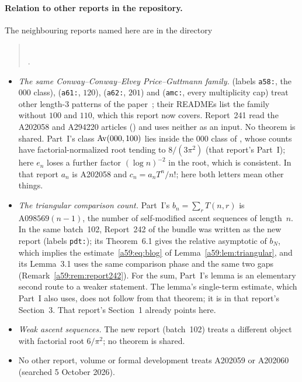 \documentclass[11pt,letterpaper]{article}
\theoremstyle{remark}\newtheorem{remark}[theorem]{Remark}
\theoremstyle{remark}\newtheorem{wremark}{Remark}\renewcommand{\thewremark}{W\arabic{wremark}}
\theoremstyle{plain}\newtheorem{wcorollary}[wremark]{Corollary}
\begin{document}
\paragraph{Relation to other reports in the repository.}
The neighbouring reports named here are in the directory
\begin{quote}\small
{}\\
.
\end{quote}
\begin{itemize}
\item \emph{The same Conway--Conway--Elvey Price--Guttmann family.}
 (labels \texttt{a58:}, the $000$ class),
 (\texttt{a61:}, $120$),
 (\texttt{a62:}, $201$) and
 (\texttt{amc:}, every multiplicity
cap) treat other length-3 patterns of the paper~\cite{conway}; their READMEs
list the family without $100$ and $110$, which this report now covers.
Report~241 read the A202058 and A294220 articles (\cite{MultiplicityReports}) and
uses neither as an input. No theorem is shared. Part~I's class
$\operatorname{Av}(000,100)$ lies inside the $000$ class of
, whose counts have factorial-normalized
root tending to $8/(3\pi^2)$ (that report's Part~I); here $e_n$ loses a
further factor $(\log n)^{-2}$ in the root, which is consistent. In that
report $a_n$ is A202058 and $c_n=a_nT^n/n!$; here both letters mean other
things.
\item \emph{The triangular comparison count.} Part~I's $b_n=\sum_rT(n,r)$
is $\mathrm{A098569}(n-1)$, the number of self-modified ascent sequences of
length~$n$. In the same batch~102, Report~242 of the bundle was written
as the new report  (labels
\texttt{pdt:}); its Theorem~6.1 gives the relative asymptotic of $b_N$,
which implies the estimate~\eqref{a59:eq:blog} of
Lemma~\ref{a59:lem:triangular}, and its Lemma~3.1 uses the
same comparison phase and the same two gaps
(Remark~\ref{a59:rem:report242}). For the sum, Part~I's lemma is an
elementary second route to a weaker statement. The lemma's single-term
estimate, which Part~I also uses, does not follow from that theorem; it is
in that report's Section~3. That report's Section~1 already points here.
\item \emph{Weak ascent sequences.} The new report 
(batch~102) treats a different object with factorial root $6/\pi^2$; no
theorem is shared.
\item No other report, volume or formal development treats A202059 or
A202060 (searched 5 October 2026).
\end{itemize}
\end{document}
